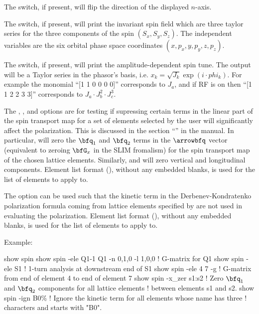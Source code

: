 {{{{{{{{{The  switch, if present, will flip the direction of the displayed $n$-axis. 

The  switch, if present, will print the invariant spin field which are three taylor series
for the three components of the spin $(S_x, S_y, S_z)$. The independent variables are the six orbital
phase space coordinates $(x, p_x, y, p_y, z, p_z)$.

The  switch, if present, will print the amplitude-dependent spin tune. The output will 
be a Taylor series in the phasor's basis, i.e. $x_k = \sqrt{J_k}\exp{(i\cdot phi_k)}$. For example the 
monomial ``[1 1 0 0 0 0]'' corresponds to $J_a$, and if RF is on then ``[1 1 2 2 3 3]'' corresponds 
to $J_a \cdot J_b^2 \cdot J_c^3$.

The , , and  options are for testing if supressing certain terms
in the linear part of the spin transport map for a set of elements selected by the user will
significantly affect the polarization. This is discussed in the section ``'' in the \bmad manual. In particular,  will zero the $\bfq_1$ and $\bfq_2$
terms in the $\arrowbfq$ vector (equivalent to zeroing $\bfG_x$ in the SLIM fromalism) for the spin
transport map of the chosen lattice elements. Similarly,  and  will zero
vertical and longitudinal components. Element list format (), without any
embedded blanks, is used for the  list of elements to apply to.

The  option can be used such that the kinetic term in the Derbenev-Kondratenko
polarization formula coming from lattice elements specified by  are not used in
evaluating the polarization. Element list format (), without any embedded
blanks, is used for the  list of elements to apply to.


Example:
\begin{example}
  show spin
  show spin -ele Q1-1 Q1 -n 0,1,0 -l 1,0,0  ! G-matrix for Q1
  show spin -ele S1      ! 1-turn analysis at downstream end of S1 
  show spin -ele 4 7 -g  ! G-matrix from end of element 4 to end of element 7
  show spin -x_zer s1:s2 ! Zero \(\bfq_1\) and \(\bfq_2\) components for all lattice elements
                         ! between elements s1 and s2.
  show spin -ign B0\%    ! Ignore the kinetic term for all elements whose name has three 
                         !   characters and starts with "B0".
\end{example}

}}}}}}}}}
